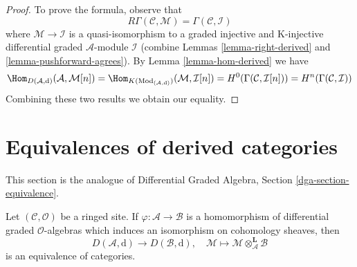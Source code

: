 \begin{proof}
To prove the formula, observe that
$$
R\Gamma(\mathcal{C}, \mathcal{M}) = \Gamma(\mathcal{C}, \mathcal{I})
$$
where $\mathcal{M} \to \mathcal{I}$ is a quasi-isomorphism
to a graded injective and K-injective differential graded
$\mathcal{A}$-module $\mathcal{I}$ (combine
Lemmas \ref{lemma-right-derived} and \ref{lemma-pushforward-agrees}).
By Lemma \ref{lemma-hom-derived} we have
$$
\Hom_{D(\mathcal{A}, \text{d})}(\mathcal{A}, \mathcal{M}[n]) =
\Hom_{K(\text{Mod}_{(\mathcal{A}, \text{d})})}(\mathcal{M}, \mathcal{I}[n]) =
H^0(\Gamma(\mathcal{C}, \mathcal{I}[n])) =
H^n(\Gamma(\mathcal{C}, \mathcal{I}))
$$
Combining these two results we obtain our equality.
\end{proof}








\section{Equivalences of derived categories}
\label{section-equivalence}

\noindent
This section is the analogue of
Differential Graded Algebra, Section \ref{dga-section-equivalence}.

\begin{lemma}
\label{lemma-qis-equivalence}
Let $(\mathcal{C}, \mathcal{O})$ be a ringed site.
If $\varphi : \mathcal{A} \to \mathcal{B}$ is a homomorphism of
differential graded $\mathcal{O}$-algebras which induces an
isomorphism on cohomology sheaves, then
$$
D(\mathcal{A}, \text{d}) \longrightarrow D(\mathcal{B}, \text{d}), \quad
\mathcal{M}
\longmapsto
\mathcal{M} \otimes_\mathcal{A}^\mathbf{L} \mathcal{B}
$$
is an equivalence of categories.
\end{lemma}

